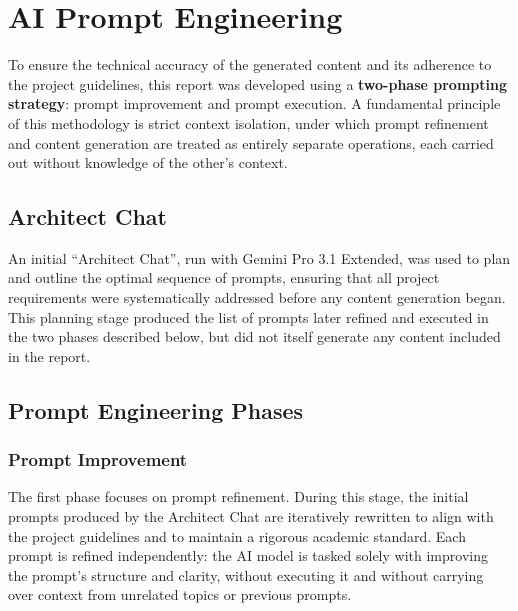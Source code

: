 \documentclass[11pt]{report}
\begin{document}

\chapter{AI Prompt Engineering}
\label{AIPromptEngineering}

To ensure the technical accuracy of the generated content and its adherence
to the project guidelines, this report was developed using a
\textbf{two-phase prompting strategy}: prompt improvement and prompt
execution. A fundamental principle of this methodology is strict context
isolation, under which prompt refinement and content generation are treated
as entirely separate operations, each carried out without knowledge of the
other's context.

\section{Architect Chat}
\label{AIPromptEngineering:ArchitectChat}

An initial ``Architect Chat'', run with Gemini Pro 3.1 Extended, was used to
plan and outline the optimal sequence of prompts, ensuring that all project
requirements were systematically addressed before any content generation
began. This planning stage produced the list of prompts later refined and
executed in the two phases described below, but did not itself generate any
content included in the report.

\section{Prompt Engineering Phases}
\label{AIPromptEngineering:Phases}

\subsection{Prompt Improvement}
\label{AIPromptEngineering:Phases:PromptImprovement}

The first phase focuses on prompt refinement. During this stage, the
initial prompts produced by the Architect Chat are iteratively rewritten to
align with the project guidelines and to maintain a rigorous academic
standard. Each prompt is refined independently: the AI model is tasked
solely with improving the prompt's structure and clarity, without executing
it and without carrying over context from unrelated topics or previous
prompts.
\end{document}
